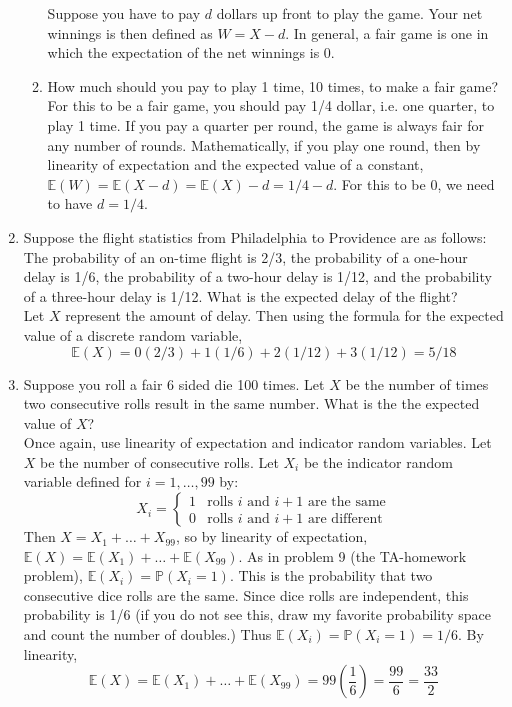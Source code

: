 \documentclass[12pt]{article}
\def\P{{\mathbb P}}
\def\E{{\mathbb E}}
\begin{document}
\begin{enumerate}
\begin{enumerate}
Suppose you have to pay $d$ dollars up front to play the game. Your net winnings is then defined as $W = X - d$. In general, a fair game is one in which the expectation of the net winnings is 0.
\item How much should you pay to play 1 time, 10 times, to make a fair game?\\

For this to be a fair game, you should pay 1/4 dollar, i.e. one quarter, to play 1 time. If you pay a quarter per round, the game is always fair for any number of rounds. Mathematically, if you play one round, then by linearity of expectation and the expected value of a constant, $\E(W) = \E(X - d) = \E(X) - d = 1/4 - d$. For this to be 0, we need to have $d = 1/4$.

\end{enumerate}

\item Suppose the flight statistics from Philadelphia to Providence are as follows: The probability of an on-time flight is 2/3, the probability of a one-hour delay is 1/6, the probability of a two-hour delay is 1/12, and the probability of a three-hour delay is 1/12. What is the expected delay of the flight?\\

Let $X$ represent the amount of delay. Then using the formula for the expected value of a discrete random variable,
\[
\E(X) = 0(2/3) + 1(1/6) + 2(1/12) + 3(1/12) = 5/18
\]

\item Suppose you roll a fair 6 sided die 100 times. Let $X$ be the number of times two consecutive rolls result in the same number. What is the the expected value of $X$?\\

Once again, use linearity of expectation and indicator random variables. Let $X$ be the number of consecutive rolls. Let $X_i$ be the indicator random variable defined for $i = 1, \dots, 99$ by:
\[
X_i =\begin{cases}
1 & \text{rolls $i$ and $i+1$ are the same}\\
0 & \text{rolls $i$ and $i+1$ are different}
\end{cases}
\]
Then $X = X_1 + \dots + X_{99}$, so by linearity of expectation, $\E(X) = \E(X_1) + \dots + \E(X_{99})$. As in problem 9 (the TA-homework problem), $\E(X_i) = \P(X_i = 1)$. This is the probability that two consecutive dice rolls are the same. Since dice rolls are independent, this probability is 1/6 (if you do not see this, draw my favorite probability space and count the number of doubles.) Thus $\E(X_i) = \P(X_i = 1) = 1/6$. By linearity,
\[
\E(X) = \E(X_1) + \dots + \E(X_{99}) = 99 \left(\frac{1}{6}\right) = \frac{99}{6} = \frac{33}{2}
\]


\end{enumerate}
\end{document}
